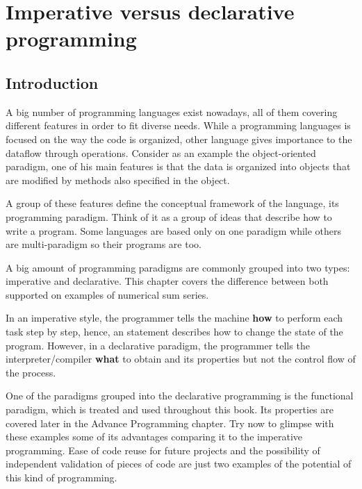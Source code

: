 
\newpage 
\chapter{Imperative versus declarative programming} 


\section{Introduction}
A big number of programming languages exist nowadays, all of them covering different features 
in order to fit diverse needs. While a programming languages is focused on the way the 
code is organized, other language gives importance to the dataflow through operations.
Consider as an example the object-oriented paradigm, one of his main features 
is that the data is organized into objects 
that are modified by methods also specified in the object.

A group of these features define the conceptual framework of the language, its programming paradigm.
Think of it as a group of ideas that describe how to write a program. Some languages are based only on one 
paradigm while others are multi-paradigm so their programs are too.  

A big amount of programming paradigms are commonly grouped into two types: imperative and declarative. 
This chapter covers the difference between both supported on examples of numerical sum series.

In an imperative style, the programmer tells the machine \textbf{how} to perform each task step by step,
hence, an statement describes how to change the state of the program.
However, in a declarative paradigm, the programmer tells the interpreter/compiler \textbf{what} to obtain
and its properties but not the control flow of the process. 

One of the paradigms grouped into the declarative programming is the functional paradigm, which is treated 
and used throughout this book. Its properties are covered later in the Advance Programming chapter. 
Try now to glimpse with these examples some of its advantages comparing it to the imperative programming.
Ease of code reuse for future projects and the possibility of independent validation of pieces of code are
just two examples of the potential of this kind of programming.  
 





